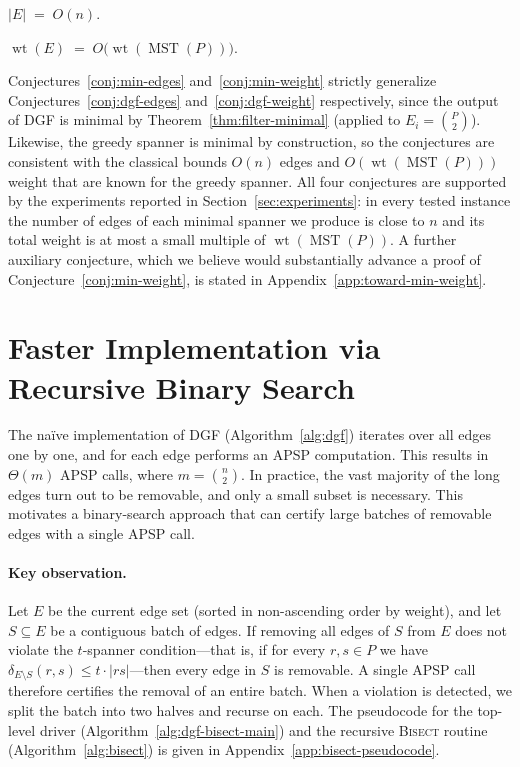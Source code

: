 \documentclass{cccg26}
\DeclareMathOperator{\wt}{wt}
\DeclareMathOperator{\MST}{MST}
\begin{document}
\begin{conj}\label{conj:min-edges}
$|E| \;=\; O(n)$.
\end{conj}

\begin{conj}\label{conj:min-weight}
$\wt(E) \;=\; O\!\bigl(\wt(\MST(P))\bigr)$.
\end{conj}

Conjectures~\ref{conj:min-edges} and~\ref{conj:min-weight} strictly
generalize Conjectures~\ref{conj:dgf-edges} and~\ref{conj:dgf-weight}
respectively, since the output of DGF is minimal by
Theorem~\ref{thm:filter-minimal} (applied to $E_i=\binom{P}{2}$).
Likewise, the greedy spanner is minimal by construction, so the
conjectures are consistent with the classical bounds $O(n)$ edges
and $O(\wt(\MST(P)))$ weight that are known for the greedy spanner.
All four conjectures are supported by the experiments reported in
Section~\ref{sec:experiments}: in every tested instance the number of
edges of each minimal spanner we produce is close to $n$ and its
total weight is at most a small multiple of $\wt(\MST(P))$.
A further auxiliary conjecture, which we believe would substantially
advance a proof of Conjecture~\ref{conj:min-weight}, is stated in
Appendix~\ref{app:toward-min-weight}.

\section{Faster Implementation via Recursive Binary Search}
\label{sec:binary-search}

The na\"ive implementation of DGF (Algorithm~\ref{alg:dgf}) iterates
over all edges one by one, and for each edge performs an APSP
computation. This results in $\Theta(m)$ APSP calls, where
$m=\binom{n}{2}$. In practice, the vast majority of the long edges turn
out to be removable, and only a small subset is necessary. This
motivates a binary-search approach that can certify large batches of
removable edges with a single APSP call.

\paragraph{Key observation.}
Let $E$ be the current edge set (sorted in non-ascending order by
weight), and let $S \subseteq E$ be a contiguous batch of edges. If
removing all edges of $S$ from $E$ does not violate the $t$-spanner
condition---that is, if for every $r,s\in P$ we have
$\delta_{E\setminus S}(r,s) \le t\cdot|rs|$---then every edge in $S$
is removable. A single APSP call therefore certifies the removal of an
entire batch. When a violation is detected, we split the batch into two
halves and recurse on each. The pseudocode for the top-level driver
(Algorithm~\ref{alg:dgf-bisect-main}) and the recursive
\textsc{Bisect} routine (Algorithm~\ref{alg:bisect}) is given in
Appendix~\ref{app:bisect-pseudocode}.
\end{document}
